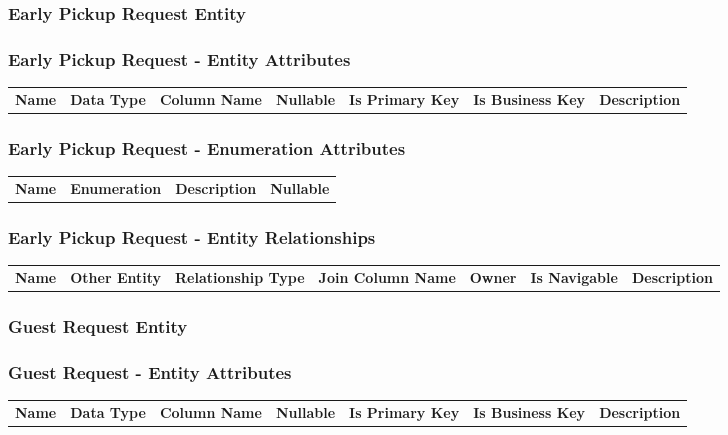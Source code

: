 \subsubsection{ Early Pickup Request Entity }

\subsubsection*{ Early Pickup Request - Entity Attributes }

\begin{tabular}{lllcccl}
\bfseries Name & \bfseries Data Type & \bfseries Column Name & \bfseries Nullable & \bfseries Is Primary Key & \bfseries Is Business Key & \bfseries Description\\
\end{tabular}

\subsubsection*{ Early Pickup Request - Enumeration Attributes}

\begin{tabular}{lcp{6.0cm}c}
\bfseries Name & \bfseries Enumeration & \bfseries Description & \bfseries Nullable \\
\end{tabular}

\subsubsection*{ Early Pickup Request - Entity Relationships}

\begin{tabular}{llllllp{2.0cm}}
\bfseries Name & \bfseries Other Entity & \bfseries Relationship Type & \bfseries Join Column Name & \bfseries Owner & \bfseries Is Navigable & \bfseries Description\\
\end{tabular}


\subsubsection{ Guest Request Entity }

\subsubsection*{ Guest Request - Entity Attributes }

\begin{tabular}{lllcccl}
\bfseries Name & \bfseries Data Type & \bfseries Column Name & \bfseries Nullable & \bfseries Is Primary Key & \bfseries Is Business Key & \bfseries Description\\
\end{tabular}

